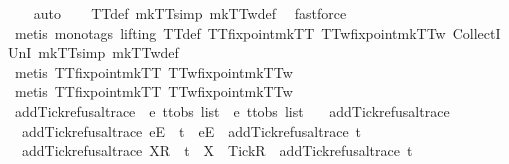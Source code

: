 %
\isadelimproof
\ \ %
\endisadelimproof
%
\isatagproof
{}\isamarkupfalse%
\ auto\isanewline
\ \ \isamarkupfalse%
\ TT{}{\isacharunderscore}def\ mkTT{}{\isacharunderscore}simp\ mkTT{}w{\isacharunderscore}def\ \isamarkupfalse%
\ fastforce\isanewline
\ \ \isamarkupfalse%
\ {\isacharparenleft}metis\ {\isacharparenleft}mono{\isacharunderscore}tags{\isacharcomma}\ lifting{\isacharparenright}\ TT{}{\isacharunderscore}def\ TT{}{\isacharunderscore}fixpoint{\isacharunderscore}mkTT{}\ TT{}w{\isacharunderscore}fixpoint{\isacharunderscore}mkTT{}w\ CollectI\ UnI{}\ mkTT{}{\isacharunderscore}simp\ mkTT{}w{\isacharunderscore}def{\isacharparenright}\ \ \isanewline
\ \ \ \ \isamarkupfalse%
\ {\isacharparenleft}metis\ TT{}{\isacharunderscore}fixpoint{\isacharunderscore}mkTT{}\ TT{}w{\isacharunderscore}fixpoint{\isacharunderscore}mkTT{}w{\isacharparenright}\isanewline
\ \ \ \ \isamarkupfalse%
\ {\isacharparenleft}metis\ TT{}{\isacharunderscore}fixpoint{\isacharunderscore}mkTT{}\ TT{}w{\isacharunderscore}fixpoint{\isacharunderscore}mkTT{}w{\isacharparenright}%
\endisatagproof
{\isafoldproof}%
%
\isadelimproof
\isanewline
%
\endisadelimproof
\isanewline
{}\isamarkupfalse%
\ add{\isacharunderscore}Tick{\isacharunderscore}refusal{\isacharunderscore}trace\ {\isacharcolon}{\isacharcolon}\ {\isachardoublequoteopen}{\isacharprime}e\ ttobs\ list\ {\isasymRightarrow}\ {\isacharprime}e\ ttobs\ list{\isachardoublequoteclose}\ \isanewline
\ \ {\isachardoublequoteopen}add{\isacharunderscore}Tick{\isacharunderscore}refusal{\isacharunderscore}trace\ {\isacharbrackleft}{\isacharbrackright}\ {\isacharequal}\ {\isacharbrackleft}{\isacharbrackright}{\isachardoublequoteclose}\ {\isacharbar}\isanewline
\ \ {\isachardoublequoteopen}add{\isacharunderscore}Tick{\isacharunderscore}refusal{\isacharunderscore}trace\ {\isacharparenleft}{\isacharbrackleft}e{\isacharbrackright}\isactrlsub E\ {\isacharhash}\ t{\isacharparenright}\ {\isacharequal}\ {\isacharbrackleft}e{\isacharbrackright}\isactrlsub E\ {\isacharhash}\ add{\isacharunderscore}Tick{\isacharunderscore}refusal{\isacharunderscore}trace\ t{\isachardoublequoteclose}\ {\isacharbar}\isanewline
\ \ {\isachardoublequoteopen}add{\isacharunderscore}Tick{\isacharunderscore}refusal{\isacharunderscore}trace\ {\isacharparenleft}{\isacharbrackleft}X{\isacharbrackright}\isactrlsub R\ {\isacharhash}\ t{\isacharparenright}\ {\isacharequal}\ {\isacharbrackleft}X\ {\isasymunion}\ {\isacharbraceleft}Tick{\isacharbraceright}{\isacharbrackright}\isactrlsub R\ {\isacharhash}\ add{\isacharunderscore}Tick{\isacharunderscore}refusal{\isacharunderscore}trace\ t{\isachardoublequoteclose}\isanewline
